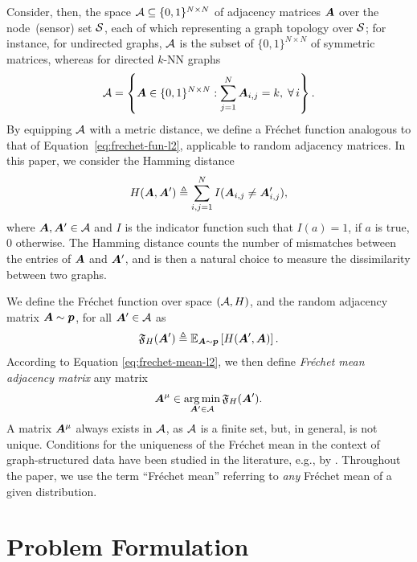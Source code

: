 Consider, then, the space ${\mathcal{A}}\subseteq \{0,1\}^{N\times N}$ of adjacency matrices ${\bm{A}}$ over the node~(sensor) set $\mathcal{S}$, each of which representing a graph topology over $\mathcal{S}$; for instance, for undirected graphs, ${\mathcal{A}}$ is the subset of $\{0,1\}^{N\times N}$ of symmetric matrices, whereas for directed $k$-NN graphs 
\begin{equation}\label{eq:support-sns}
{\mathcal{A}} = \left\{{\bm{A}} \in\{0,1\}^{N\times N} : \sum_{j=1}^N {\bm{A}}_{i,j} = k, \;\forall\,i \right\}.
\end{equation}
By equipping ${\mathcal{A}}$ with a metric distance,  we define a Fr\'echet function analogous to that of Equation~\eqref{eq:frechet-fun-l2}, applicable to random adjacency matrices. In this paper, we consider the Hamming distance
\begin{equation}
H({\bm{A}},{\bm{A}}') \triangleq \sum_{i,j=1}^N I({\bm{A}}_{i,j} \ne {\bm{A}}_{i,j}'),
\end{equation}
where ${\bm{A}},{\bm{A}}'\in {\mathcal{A}}$ and $I$ is the indicator function such that $I(a)=1$, if $a$ is true, $0$ otherwise. The Hamming distance counts the number of mismatches between the entries of ${\bm{A}}$ and ${\bm{A}}'$, and is then a natural choice to measure the dissimilarity between two graphs. 

We define the Fr\'echet function over space $({\mathcal{A}},H)$, and the random adjacency matrix ${\bm{A}}\sim {\bm{p}}$, for all ${\bm{A}}'\in{\mathcal{A}}$ as
\begin{equation}\label{eq:frechet-fun-H}
\mathfrak{F}_H({\bm{A}}') \triangleq \mathbb{E}_{{\bm{A}}\sim {\bm{p}}}\left[H({\bm{A}}',{\bm{A}})\right].
\end{equation}
According to Equation \ref{eq:frechet-mean-l2}, we then define \emph{Fr\'echet mean adjacency matrix} any matrix
\begin{equation}\label{eq:frechet-mean-H}
{\bm{A}}^\mu\in\operatorname*{arg\,min}_{{\bm{A}}'\in{\mathcal{A}}}\mathfrak{F}_H({\bm{A}}'). 
\end{equation}
A matrix ${\bm{A}}^\mu$ always exists in ${\mathcal{A}}$, as ${\mathcal{A}}$ is a finite set, but, in general, is not unique. Conditions for the uniqueness of the Fr\'echet mean in the context of graph-structured data have been studied in the literature, e.g., by \citet{jain2016statistical}. Throughout the paper, we use the term ``Fr\'echet mean'' referring to \emph{any} Fr\'echet mean of a given distribution. 

\section{Problem Formulation}\label{s:problem}

